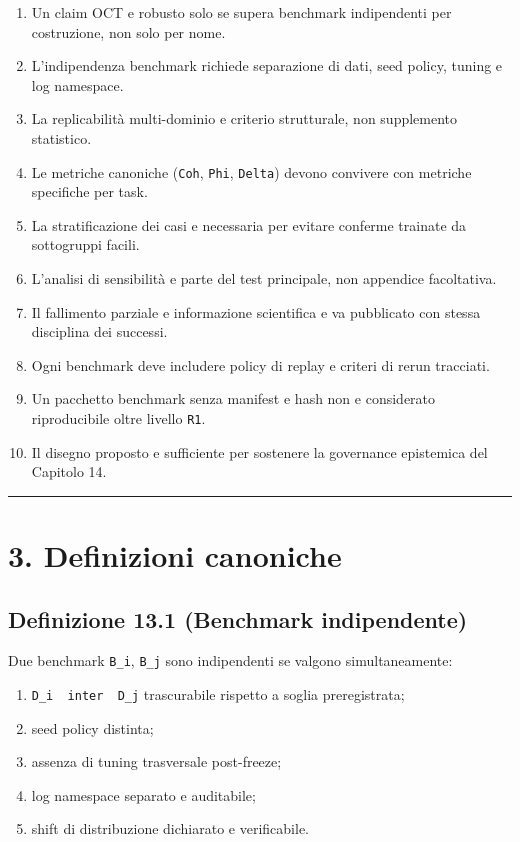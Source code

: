 \begin{enumerate}
\def\labelenumi{\arabic{enumi}.}
\tightlist
\item
  Un claim OCT e robusto solo se supera benchmark indipendenti per costruzione, non solo per nome.
\item
  L'indipendenza benchmark richiede separazione di dati, seed policy, tuning e log namespace.
\item
  La replicabilità multi-dominio e criterio strutturale, non supplemento statistico.
\item
  Le metriche canoniche (\texttt{Coh}, \texttt{Phi}, \texttt{Delta}) devono convivere con metriche specifiche per task.
\item
  La stratificazione dei casi e necessaria per evitare conferme trainate da sottogruppi facili.
\item
  L'analisi di sensibilità e parte del test principale, non appendice facoltativa.
\item
  Il fallimento parziale e informazione scientifica e va pubblicato con stessa disciplina dei successi.
\item
  Ogni benchmark deve includere policy di replay e criteri di rerun tracciati.
\item
  Un pacchetto benchmark senza manifest e hash non e considerato riproducibile oltre livello \texttt{R1}.
\item
  Il disegno proposto e sufficiente per sostenere la governance epistemica del Capitolo 14.
\end{enumerate}

\begin{center}\rule{0.5\linewidth}{0.5pt}\end{center}

\section{3. Definizioni canoniche}

\subsection{Definizione 13.1 (Benchmark indipendente)}

Due benchmark \texttt{B\_i}, \texttt{B\_j} sono indipendenti se valgono simultaneamente:

\begin{enumerate}
\def\labelenumi{\arabic{enumi}.}
\tightlist
\item
  \texttt{D\_i\ \ inter\ \ D\_j} trascurabile rispetto a soglia preregistrata;
\item
  seed policy distinta;
\item
  assenza di tuning trasversale post-freeze;
\item
  log namespace separato e auditabile;
\item
  shift di distribuzione dichiarato e verificabile.
\end{enumerate}

